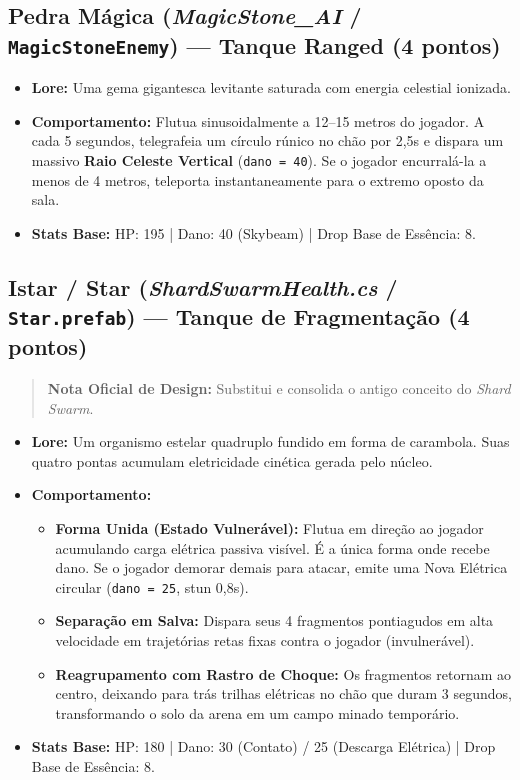 \documentclass[a4paper,12pt]{report}
\begin{document}
\subsection{Pedra Mágica (\textit{MagicStone\_AI} / \texttt{MagicStoneEnemy}) --- Tanque Ranged (4 pontos)}
\begin{itemize}
    \item \textbf{Lore:} Uma gema gigantesca levitante saturada com energia celestial ionizada.
    \item \textbf{Comportamento:} Flutua sinusoidalmente a 12--15 metros do jogador. A cada 5 segundos, telegrafeia um círculo rúnico no chão por 2,5s e dispara um massivo \textbf{Raio Celeste Vertical} (\texttt{dano = 40}). Se o jogador encurralá-la a menos de 4 metros, teleporta instantaneamente para o extremo oposto da sala.
    \item \textbf{Stats Base:} HP: 195 | Dano: 40 (Skybeam) | Drop Base de Essência: 8.
\end{itemize}

\subsection{Istar / Star (\textit{ShardSwarmHealth.cs} / \texttt{Star.prefab}) --- Tanque de Fragmentação (4 pontos)}
\begin{quote}
    \textbf{Nota Oficial de Design:} Substitui e consolida o antigo conceito do \textit{Shard Swarm}.
\end{quote}
\begin{itemize}
    \item \textbf{Lore:} Um organismo estelar quadruplo fundido em forma de carambola. Suas quatro pontas acumulam eletricidade cinética gerada pelo núcleo.
    \item \textbf{Comportamento:}
    \begin{itemize}
        \item \textbf{Forma Unida (Estado Vulnerável):} Flutua em direção ao jogador acumulando carga elétrica passiva visível. É a única forma onde recebe dano. Se o jogador demorar demais para atacar, emite uma Nova Elétrica circular (\texttt{dano = 25}, stun 0,8s).
        \item \textbf{Separação em Salva:} Dispara seus 4 fragmentos pontiagudos em alta velocidade em trajetórias retas fixas contra o jogador (invulnerável).
        \item \textbf{Reagrupamento com Rastro de Choque:} Os fragmentos retornam ao centro, deixando para trás trilhas elétricas no chão que duram 3 segundos, transformando o solo da arena em um campo minado temporário.
    \end{itemize}
    \item \textbf{Stats Base:} HP: 180 | Dano: 30 (Contato) / 25 (Descarga Elétrica) | Drop Base de Essência: 8.
\end{itemize}
\end{document}
